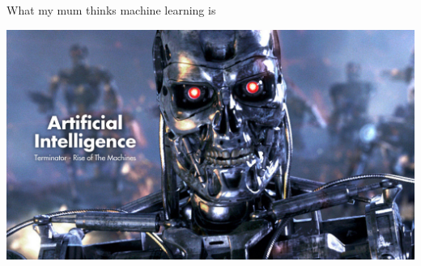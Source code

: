 \documentclass[pdf]{beamer}
\begin{document}
\begin{frame}{What my mum thinks machine learning is}
\begin{center}
	\includegraphics[width=\textwidth]{AI.jpg}
\end{center}
\end{frame}
\end{document}
